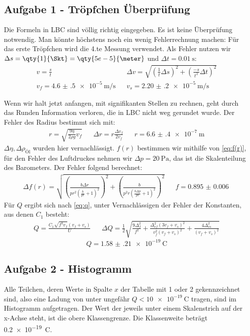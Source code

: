 \subsection{Aufgabe 1 - Tröpfchen Überprüfung}
Die Formeln in LBC sind völlig richtig eingegeben. Es ist keine Überprüfung notwendig. Man könnte höchstens noch ein wenig Fehlerrechnung machen: Für das erste Tröpfchen wird die 4.te Messung verwendet. Als Fehler nutzen wir \(\Delta s=\qty{1}{\Skt} = \qty{5e-5}{\meter}\) und \(\Delta t=\qty{0.01}{\s}\):
\begin{align}
    v=\frac{s}{t}&&\Delta v=\sqrt{\left(\frac{1}{t} \Delta s\right)^2+\left(\frac{-s}{t^2} \Delta t\right)^2}\\
    v_f=\qty{4.6(5)e-5}{\meter\per\s}&&v_s=\qty{2.20(20)e-5}{\meter\per\s}
\end{align}

Wenn wir halt jetzt anfangen, mit signifikanten Stellen zu rechnen, geht durch das Runden Information verloren, die in LBC nicht weg gerundet wurde. Der Fehler des Radius bestimmt sich mit:
\begin{align}
    r=\sqrt{\frac{9\eta}{2\rho g}v_f}&&\Delta r=r \frac{\Delta v_f}{2v_f}&&r=\qty{6.6(4)e-7}{\meter}
\end{align}
\(\Delta \eta, \Delta \rho_{\text{Öl}}\) wurden hier vernachlässigt. 
\(f(r)\) bestimmen wir mithilfe von \cref{eq:f(r)}, für den Fehler des Luftdruckes nehmen wir \(\Delta p=\qty{20}{\pascal}\), das ist die Skalenteilung des Barometers. Der Fehler folgend berechnet:
\begin{align}
    \Delta f(r)=\sqrt{\left(\frac{b\Delta r}{p r^2 \left(\frac{b}{p r}+1\right)^2} \right)^2+\left(\frac{b}{p^2 r \left(\frac{b\Delta p}{p r}+1\right)^2} \right)^2}&&f=\qty{0.895(6)}{}
\end{align}
Für \(Q\) ergibt sich nach \cref{eq:q}, unter Vernachlässigen der Fehler der Konstanten, aus denen \(C_1\) besteht:
\begin{align}
    Q=\frac{C_{1} \sqrt{f^{3} v_{f}} \left(v_{f} + v_{s}\right)}{U}&& \Delta Q=\frac{1}{2}\sqrt{\frac{9 \Delta_{f}^{2}}{f^{2}} + \frac{\Delta_{v f}^{2} \left(3 v_{f} + v_{s}\right)^{2}}{v_{f}^{2} \left(v_{f} + v_{s}\right)^{2}} + \frac{4 \Delta_{v s}^{2}}{\left(v_{f} + v_{s}\right)^{2}}}
\end{align}
\[Q=\qty{1.58(21)e-19}{\coulomb}\]

\subsection{Aufgabe 2 - Histogramm}
Alle Teilchen, deren Werte in Spalte \(x\) der Tabelle mit 1 oder 2 gekennzeichnet sind, also eine Ladung von unter ungefähr \(Q<\qty{10e-19}{\coulomb}\) tragen, sind im Histogramm aufgetragen. Der Wert der jeweils unter einem Skalenstrich auf der x-Achse steht, ist die obere Klassengrenze. Die Klassenweite beträgt \qty{0.2e-19}{\coulomb}. 

